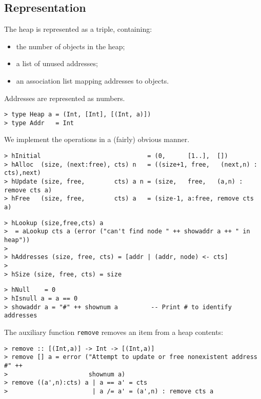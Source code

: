 \subsection{Representation}

The heap is represented as a triple, containing:
\begin{itemize}
\item the number of objects in the heap;
\item a list of unused addresses;
\item an association list mapping addresses to objects.
\end{itemize}
Addresses are represented as numbers.
\begin{verbatim}
> type Heap a = (Int, [Int], [(Int, a)])
> type Addr   = Int
\end{verbatim}
%
%
\par
We implement the operations in a (fairly) obvious manner.
\begin{verbatim}
> hInitial                             = (0,      [1..],  [])
> hAlloc  (size, (next:free), cts) n   = ((size+1, free,   (next,n) : cts),next)
> hUpdate (size, free,        cts) a n = (size,   free,   (a,n) : remove cts a)
> hFree   (size, free,        cts) a   = (size-1, a:free, remove cts a)
\end{verbatim}
%
%
%
%
\begin{verbatim}
> hLookup (size,free,cts) a
>  = aLookup cts a (error ("can't find node " ++ showaddr a ++ " in heap"))
>
> hAddresses (size, free, cts) = [addr | (addr, node) <- cts]
>
> hSize (size, free, cts) = size
\end{verbatim}
%
%
%
\begin{verbatim}
> hNull    = 0
> hIsnull a = a == 0
> showaddr a = "#" ++ shownum a         -- Print # to identify addresses
\end{verbatim}
%
%
%
\par
The auxiliary function \mbox{\tt remove} removes an item from a heap contents:
\begin{verbatim}
> remove :: [(Int,a)] -> Int -> [(Int,a)]
> remove [] a = error ("Attempt to update or free nonexistent address #" ++
>                      shownum a)
> remove ((a',n):cts) a | a == a' = cts
>                       | a /= a' = (a',n) : remove cts a
\end{verbatim}
%
%
%
